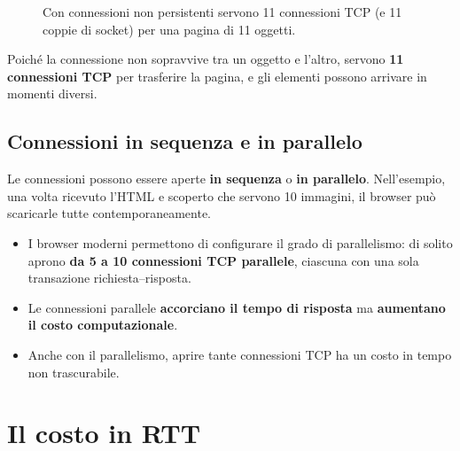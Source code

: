 \begin{figure}[H]
\centering
{}
\caption{Con connessioni non persistenti servono 11 connessioni TCP (e 11 coppie di socket) per una pagina di 11 oggetti.}
\end{figure}

Poiché la connessione non sopravvive tra un oggetto e l'altro, servono \textbf{11 connessioni TCP} per
trasferire la pagina, e gli elementi possono arrivare in momenti diversi.

\subsection{Connessioni in sequenza e in parallelo}

Le connessioni possono essere aperte \textbf{in sequenza} o \textbf{in parallelo}. Nell'esempio, una volta
ricevuto l'HTML e scoperto che servono 10 immagini, il browser può scaricarle tutte
contemporaneamente.

\begin{itemize}
    \item I browser moderni permettono di configurare il grado di parallelismo: di solito aprono \textbf{da 5
          a 10 connessioni TCP parallele}, ciascuna con una sola transazione richiesta--risposta.
    \item Le connessioni parallele \textbf{accorciano il tempo di risposta} ma \textbf{aumentano il costo
          computazionale}.
    \item Anche con il parallelismo, aprire tante connessioni TCP ha un costo in tempo non trascurabile.
\end{itemize}

\section{Il costo in RTT}

